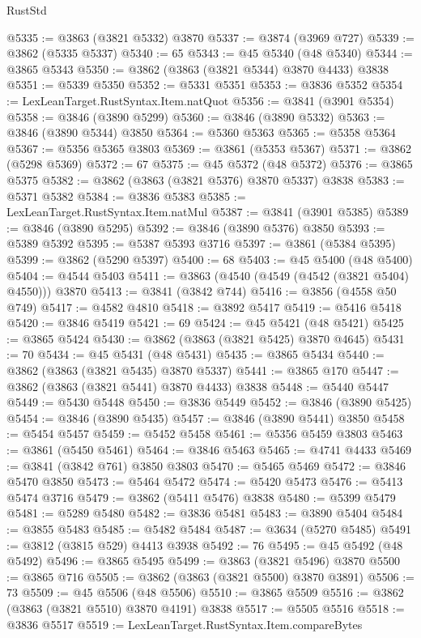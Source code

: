 \begin{lexlean}{RustStd}
\begin{coremodule}
@5335 := @3863 (@3821 @5332) @3870
@5337 := @3874 (@3969 @727)
@5339 := @3862 (@5335 @5337)
@5340 := 65
@5343 := @45 @5340 (@48 @5340)
@5344 := @3865 @5343
@5350 := @3862 (@3863 (@3821 @5344) @3870 @4433) @3838
@5351 := @5339 @5350
@5352 := @5331 @5351
@5353 := @3836 @5352
@5354 := LexLeanTarget.RustSyntax.Item.natQuot
@5356 := @3841 (@3901 @5354)
@5358 := @3846 (@3890 @5299)
@5360 := @3846 (@3890 @5332)
@5363 := @3846 (@3890 @5344) @3850
@5364 := @5360 @5363
@5365 := @5358 @5364
@5367 := @5356 @5365 @3803
@5369 := @3861 (@5353 @5367)
@5371 := @3862 (@5298 @5369)
@5372 := 67
@5375 := @45 @5372 (@48 @5372)
@5376 := @3865 @5375
@5382 := @3862 (@3863 (@3821 @5376) @3870 @5337) @3838
@5383 := @5371 @5382
@5384 := @3836 @5383
@5385 := LexLeanTarget.RustSyntax.Item.natMul
@5387 := @3841 (@3901 @5385)
@5389 := @3846 (@3890 @5295)
@5392 := @3846 (@3890 @5376) @3850
@5393 := @5389 @5392
@5395 := @5387 @5393 @3716
@5397 := @3861 (@5384 @5395)
@5399 := @3862 (@5290 @5397)
@5400 := 68
@5403 := @45 @5400 (@48 @5400)
@5404 := @4544 @5403
@5411 := @3863 (@4540 (@4549 (@4542 (@3821 @5404) @4550))) @3870
@5413 := @3841 (@3842 @744)
@5416 := @3856 (@4558 @50 @749)
@5417 := @4582 @4810
@5418 := @3892 @5417
@5419 := @5416 @5418
@5420 := @3846 @5419
@5421 := 69
@5424 := @45 @5421 (@48 @5421)
@5425 := @3865 @5424
@5430 := @3862 (@3863 (@3821 @5425) @3870 @4645)
@5431 := 70
@5434 := @45 @5431 (@48 @5431)
@5435 := @3865 @5434
@5440 := @3862 (@3863 (@3821 @5435) @3870 @5337)
@5441 := @3865 @170
@5447 := @3862 (@3863 (@3821 @5441) @3870 @4433) @3838
@5448 := @5440 @5447
@5449 := @5430 @5448
@5450 := @3836 @5449
@5452 := @3846 (@3890 @5425)
@5454 := @3846 (@3890 @5435)
@5457 := @3846 (@3890 @5441) @3850
@5458 := @5454 @5457
@5459 := @5452 @5458
@5461 := @5356 @5459 @3803
@5463 := @3861 (@5450 @5461)
@5464 := @3846 @5463
@5465 := @4741 @4433
@5469 := @3841 (@3842 @761) @3850 @3803
@5470 := @5465 @5469
@5472 := @3846 @5470 @3850
@5473 := @5464 @5472
@5474 := @5420 @5473
@5476 := @5413 @5474 @3716
@5479 := @3862 (@5411 @5476) @3838
@5480 := @5399 @5479
@5481 := @5289 @5480
@5482 := @3836 @5481
@5483 := @3890 @5404
@5484 := @3855 @5483
@5485 := @5482 @5484
@5487 := @3634 (@5270 @5485)
@5491 := @3812 (@3815 @529) @4413 @3938
@5492 := 76
@5495 := @45 @5492 (@48 @5492)
@5496 := @3865 @5495
@5499 := @3863 (@3821 @5496) @3870
@5500 := @3865 @716
@5505 := @3862 (@3863 (@3821 @5500) @3870 @3891)
@5506 := 73
@5509 := @45 @5506 (@48 @5506)
@5510 := @3865 @5509
@5516 := @3862 (@3863 (@3821 @5510) @3870 @4191) @3838
@5517 := @5505 @5516
@5518 := @3836 @5517
@5519 := LexLeanTarget.RustSyntax.Item.compareBytes

\end{coremodule}
\end{lexlean}

